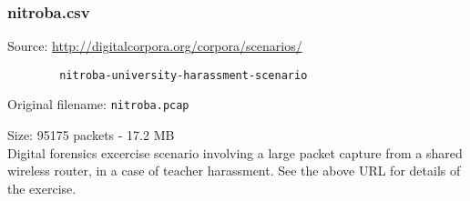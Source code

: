 \documentclass[12pt,a4paper]{article}
\newcommand{\dbl}{\\[\baselineskip]}
\begin{document}
	\subsubsection*{nitroba.csv}
	Source: \url{http://digitalcorpora.org/corpora/scenarios/}
	
	\verb!        nitroba-university-harassment-scenario!
	
	Original filename: \verb|nitroba.pcap|
	
	Size: 95175 packets - 17.2 MB\dbl
	Digital forensics excercise scenario involving a large
	packet capture from a shared wireless router, in a case of
	teacher harassment. See the above URL for details of the
	exercise.
	
\end{document}
